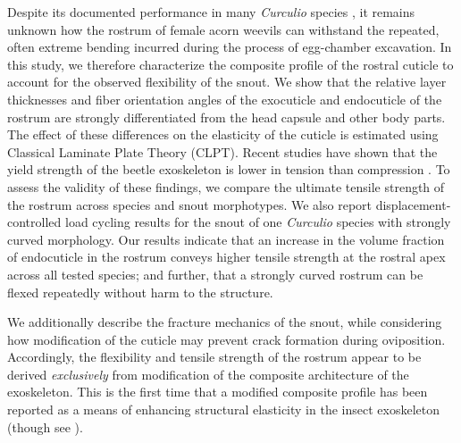 \documentclass[twocolumn, linenumbers, superscriptaddress, nofootinbib]{revtex4-1}
\begin{document}
	Despite its documented performance in many \textit{Curculio} species \cite{Gibson1969, Moffett1989, AguirreUribe1978, Toju2005}, it remains unknown how the rostrum of female acorn weevils can withstand the repeated, often extreme bending incurred during the process of egg-chamber excavation.
	In this study, we therefore characterize the composite profile of the rostral cuticle to account for the observed flexibility of the snout.
	We show that the relative layer thicknesses and fiber orientation angles of the exocuticle and endocuticle of the rostrum are strongly differentiated from the head capsule and other body parts.
	The effect of these differences on the elasticity of the cuticle is estimated using Classical Laminate Plate Theory (CLPT).
	Recent studies have shown that the yield strength of the beetle exoskeleton is lower in tension than compression \cite{Longhai2017}.
	To assess the validity of these findings, we compare the ultimate tensile strength of the rostrum across species and snout morphotypes.
	We also report displacement-controlled load cycling results for the snout of one \textit{Curculio} species with strongly curved morphology.
	Our results indicate that an increase in the volume fraction of endocuticle in the rostrum conveys higher tensile strength at the rostral apex across all tested species; and further, that a strongly curved rostrum can be flexed repeatedly without harm to the structure.
	
	We additionally describe the fracture mechanics of the snout, while considering how modification of the cuticle may prevent crack formation during oviposition.
	Accordingly, the flexibility and tensile strength of the rostrum appear to be derived \emph{exclusively} from modification of the composite architecture of the exoskeleton.
	This is the first time that a modified composite profile has been reported as a means of enhancing structural elasticity in the insect exoskeleton (though see \cite{Matsumura2017}).
	
	
\end{document}
